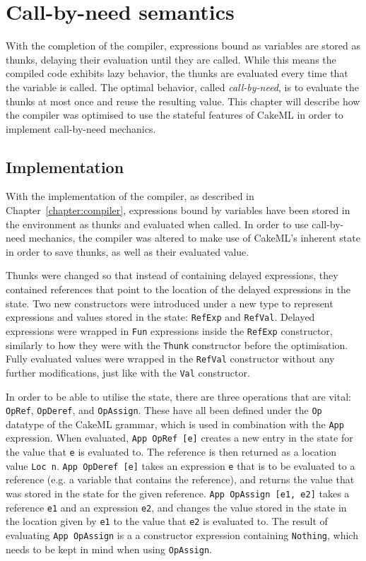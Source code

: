 \chapter{Call-by-need semantics}
With the completion of the compiler, expressions bound as variables are stored
as thunks, delaying their evaluation until they are called. While this means
the compiled code exhibits lazy behavior, the thunks are evaluated every
time that the variable is called. The optimal behavior, called
\textit{call-by-need}, is to evaluate the thunks at most once and reuse the
resulting value. This chapter will describe how the compiler was optimised to
use the stateful features of CakeML in order to implement call-by-need
mechanics.

\section{Implementation}
\label{cbn:impl}
With the implementation of the compiler, as described in
Chapter~\ref{chapter:compiler}, expressions bound by variables have been stored
in the environment as thunks and evaluated when called. In order to use
call-by-need mechanics, the compiler was altered to make use of CakeML's
inherent state in order to save thunks, as well as their evaluated value.

Thunks were changed so that instead of containing delayed expressions, they
contained references that point to the location of the delayed expressions in
the state. Two new constructors were introduced under a new type to represent
expressions and values stored in the state: \texttt{RefExp} and \texttt{RefVal}.
Delayed expressions were wrapped in \texttt{Fun} expressions inside the
\texttt{RefExp} constructor, similarly to how they were with the \texttt{Thunk}
constructor before the optimisation. Fully evaluated values were wrapped in the
\texttt{RefVal} constructor without any further modifications, just like with
the \texttt{Val} constructor.

In order to be able to utilise the state, there are three operations that are
vital: \texttt{OpRef}, \texttt{OpDeref}, and \texttt{OpAssign}. These have all
been defined under the \texttt{Op} datatype of the CakeML grammar, which is used
in combination with
the \texttt{App} expression. When evaluated, \texttt{App OpRef [e]} creates a new
entry in the state for the value that \texttt{e} is evaluated to. The reference
is then returned as a location value \texttt{Loc n}. \texttt{App OpDeref [e]}
takes an expression \texttt{e} that is to be evaluated to a reference (e.g. a
variable that contains the reference), and returns the value that was stored in
the state for the given reference. \texttt{App OpAssign [e1, e2]} takes a
reference \texttt{e1} and an expression \texttt{e2}, and changes the value
stored in the state in the location given by \texttt{e1} to the value that
\texttt{e2} is evaluated to. The result of evaluating \texttt{App OpAssign}
is a a constructor expression containing \texttt{Nothing}, which needs to be
kept in mind when using \texttt{OpAssign}.

